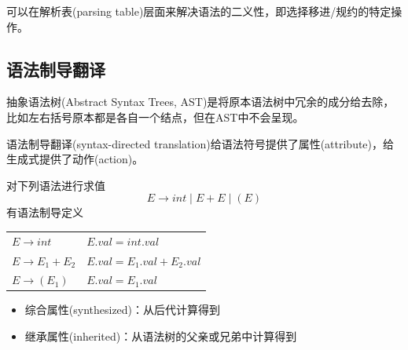 可以在解析表(parsing table)层面来解决语法的二义性，即选择移进/规约的特定操作。

\subsection{语法制导翻译}
抽象语法树(Abstract Syntax Trees, AST)是将原本语法树中冗余的成分给去除，比如左右括号原本都是各自一个结点，但在AST中不会呈现。

语法制导翻译(syntax-directed translation)给语法符号提供了属性(attribute)，给生成式提供了动作(action)。
\begin{example}
对下列语法进行求值
\[E\to int\mid E+E\mid (E)\]
有语法制导定义
\begin{center}
\begin{tabular}{ll}
$E\to int$ & $E.val=int.val$\\
$E\to E_1+E_2$ & $E.val=E_1.val+E_2.val$\\
$E\to (E_1)$ & $E.val=E_1.val$
\end{tabular}
\end{center}
\end{example}

\begin{itemize}
\item 综合属性(synthesized)：从后代计算得到
\item 继承属性(inherited)：从语法树的父亲或兄弟中计算得到
\end{itemize}